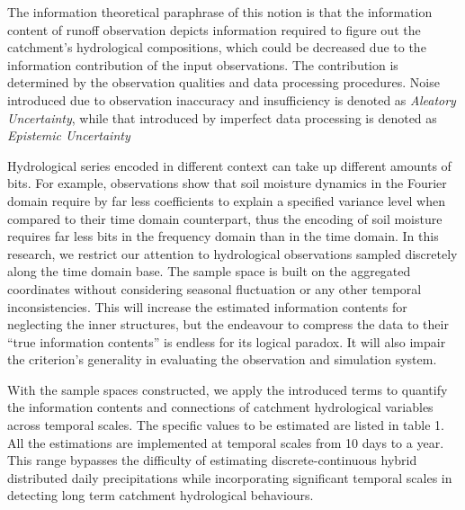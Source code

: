 \documentclass[review]{elsarticle}
\begin{document}
The information theoretical paraphrase of this notion is that the information content of runoff observation depicts information required to figure out the catchment's hydrological compositions, which could be decreased due to the information contribution of the input observations. The contribution is determined by the observation qualities and data processing procedures.
Noise introduced due to observation inaccuracy and insufficiency is denoted as \emph{Aleatory Uncertainty}, while that introduced by imperfect data processing is denoted as \emph{Epistemic Uncertainty}



Hydrological series encoded in different context can take up different amounts of bits. For example,  observations show that  soil
moisture dynamics in the Fourier domain require by far less
coefficients to explain a specified variance level when
compared to their time domain counterpart\citep{katul2007spectrum}, thus the encoding of soil moisture requires far less bits in the frequency domain than in the time domain. In this research, we restrict our attention to hydrological observations sampled discretely along the time domain base. The sample space is built on the aggregated coordinates without considering seasonal fluctuation or any other temporal inconsistencies. This will increase the estimated information contents for neglecting the inner structures, but the endeavour to compress the data to their ``true information contents'' is endless for its logical paradox\citep{li2009introduction}. It will also impair the criterion's generality in evaluating the observation and simulation system.  

 


With the sample spaces constructed,
we apply the introduced terms to quantify the information contents and connections of catchment hydrological variables across temporal scales. The specific values to be estimated are listed in table 1. All the estimations are implemented at temporal scales from 10 days to a year. This range  bypasses the difficulty of estimating discrete-continuous hybrid distributed daily precipitations\citep{gong2014estimating} while incorporating significant temporal scales in detecting long term catchment hydrological behaviours. 
\end{document}
